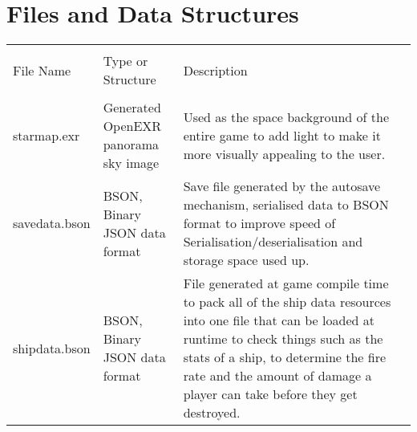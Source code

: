 \documentclass[12pt, DIV=calc]{scrartcl}
\begin{document}
\clearpage
\section{Files and Data Structures}
\begin{xltabular}[c]{\textwidth}{| X | X | X |}
    \hline \\
File Name & Type or Structure & Description \\
    \hline \hline \\
starmap.exr & Generated OpenEXR panorama sky image & Used as the space background of the entire game to add light to make it more visually appealing to the user. \\
savedata.bson & BSON, Binary JSON data format  & Save file generated by the autosave mechanism, serialised data to BSON format to improve speed of Serialisation/deserialisation and storage space used up. \\
shipdata.bson & BSON, Binary JSON data format & File generated at game compile time to pack all of the ship data resources into one file that can be loaded at runtime to check things such as the stats of a ship, to determine the fire rate and the amount of damage a player can take before they get destroyed. \\
    \hline
\end{xltabular}
\end{document}
